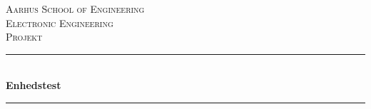 \newcommand{\HRule}{\rule{\linewidth}{0.5mm}} %

\begin{center} %
 

\textsc{\LARGE Aarhus School of Engineering}\\[1.5cm] %
\textsc{\Large Electronic Engineering}\\[0.5cm] %
\textsc{\large Projekt}\\[0.5cm] %


\HRule \\[0.4cm]
{ \huge \bfseries Enhedstest}\\[0.4cm] %
\HRule \\[1.5cm]
 


\end{center}
